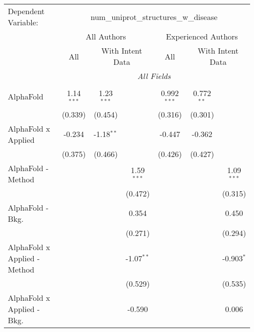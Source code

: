 \begingroup
\centering
\begin{tabular}{lcccccc}
   \tabularnewline \midrule \midrule
   Dependent Variable: & \multicolumn{6}{c}{num\_uniprot\_structures\_w\_disease}\\
 & \multicolumn{3}{c}{All Authors} & \multicolumn{3}{c}{Experienced Authors} \\
\cmidrule(lr){2-4} \cmidrule(lr){5-7}
 & \multicolumn{1}{c}{All} & \multicolumn{2}{c}{With Intent Data} & \multicolumn{1}{c}{All} & \multicolumn{2}{c}{With Intent Data} \\
\cmidrule(lr){2-2} \cmidrule(lr){3-4} \cmidrule(lr){5-5} \cmidrule(lr){6-7}
 & \multicolumn{6}{c}{\textit{All Fields}} \\ \\
   AlphaFold                      & 1.14$^{***}$ & 1.23$^{***}$  &               & 0.992$^{***}$ & 0.772$^{**}$  &   \\   
                                  & (0.339)      & (0.454)       &               & (0.316)       & (0.301)       &   \\   
   AlphaFold x Applied            & -0.234       & -1.18$^{**}$  &               & -0.447        & -0.362        &   \\   
                                  & (0.375)      & (0.466)       &               & (0.426)       & (0.427)       &   \\   
   AlphaFold - Method             &              &               & 1.59$^{***}$  &               &               & 1.09$^{***}$\\   
                                  &              &               & (0.472)       &               &               & (0.315)\\   
   AlphaFold - Bkg.               &              &               & 0.354         &               &               & 0.450\\   
                                  &              &               & (0.271)       &               &               & (0.294)\\   
   AlphaFold x Applied - Method   &              &               & -1.07$^{**}$  &               &               & -0.903$^{*}$\\   
                                  &              &               & (0.529)       &               &               & (0.535)\\   
   AlphaFold x Applied - Bkg.     &              &               & -0.590        &               &               & 0.006\\   

\end{tabular}
